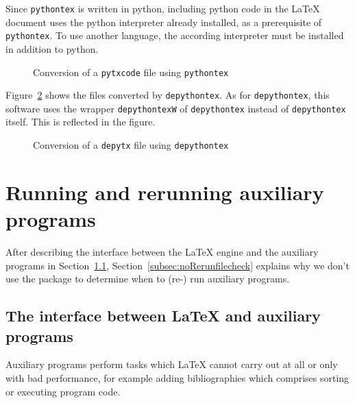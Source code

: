 Since \texttt{pythontex} is written in python, 
including python code in the \LaTeX{} document 
uses the python interpreter already installed, as a prerequisite of \texttt{pythontex}. 
To use another language, the according interpreter must be installed in addition to python. 







\begin{figure}[!htb]
  \centering
  \caption{\label{fig:py2dir}Conversion of a \texttt{pytxcode} file using \texttt{pythontex}}
  \end{figure}


  Figure~\ref{fig:depy2out} shows the files converted by \texttt{depythontex}. 
  As for \texttt{depythontex}, this software uses the wrapper \texttt{depythontexW} 
  of \texttt{depythontex} instead of \texttt{depythontex} itself. 
  This is reflected in the figure. 


  \begin{figure}[!htb]
    \centering
    \caption{\label{fig:depy2out}Conversion of a \texttt{depytx} file using \texttt{depythontex}}
    \end{figure}
  
\section{Running and rerunning auxiliary programs}%
\label{sec:runRerunAux}

After describing the interface 
between the \LaTeX{} engine and the auxiliary programs 
in Section~\ref{subsec:latexAux}, 
Section~\ref{subsec:noRerunfilecheck} explains 
why we don't use the package  
to determine when to (re-) run auxiliary programs. 


\subsection{The interface between \LaTeX{} and auxiliary programs}%
\label{subsec:latexAux}

Auxiliary programs perform tasks which \LaTeX{} cannot carry out at all 
or only with bad performance, 
for example adding bibliographies which comprises sorting 
or executing program code. 


